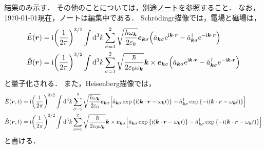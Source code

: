 \documentclass{report}
\begin{document}
  結果のみ示す．
  その他のことについては，別途\href{https://github.com/YutoMSD/physics_notes/blob/main/qft/main.pdf}{ノート}を参照すること．
  なお，\today 現在，ノートは編集中である．
  Schr\"odingr描像では，電場と磁場は，
  \begin{align}
    \hat{E}(\bm{r}) &= \mathrm{i}\qty(\frac{1}{2\pi})^{3/2}\int\dd[3]{k}\sum_{\sigma = 1}^{2}\sqrt{\frac{\hbar\omega_{\bm{k}}}{2\varepsilon_0}}\bm{e}_{\bm{k}\sigma}\qty(\hat{a}_{\bm{k}\sigma}\mathrm{e}^{\mathrm{i}\bm{k}\cdot\bm{r}} - \hat{a}_{\bm{k}\sigma}^{\dag}\mathrm{e}^{-\mathrm{i}\bm{k}\cdot\bm{r}}) \\ 
    \hat{B}(\bm{r}) &= \mathrm{i}\qty(\frac{1}{2\pi})^{3/2}\int\dd[3]{k}\sum_{\sigma = 1}^{2}\sqrt{\frac{\hbar}{2\varepsilon_0\omega_{\bm{k}}}}\bm{k}\times\bm{e}_{\bm{k}\sigma}\qty(\hat{a}_{\bm{k}\sigma}\mathrm{e}^{\mathrm{i}\bm{k}\cdot\bm{r}} - \hat{a}_{\bm{k}\sigma}^{\dag}\mathrm{e}^{-\mathrm{i}\bm{k}\cdot\bm{r}}) 
  \end{align}
  と量子化される．
  また，Heisenberg描像では，
  \begin{align}
    \hat{E}(\bm{r}, t) &= \mathrm{i}\qty(\frac{1}{2\pi})^{3/2}\int\dd[3]{k}\sum_{\sigma = 1}^{2}\sqrt{\frac{\hbar\omega_{\bm{k}}}{2\varepsilon_0}}\bm{e}_{\bm{k}\sigma}\qty[\hat{a}_{\bm{k}\sigma}\exp\qty{\mathrm{i}\qty(\bm{k}\cdot\bm{r} - \omega_{\bm{k}}t)} - \hat{a}_{\bm{k}\sigma}^{\dag}\exp\qty{-\mathrm{i}\qty(\bm{k}\cdot\bm{r} - \omega_{\bm{k}}t)}] \\ 
    \hat{B}(\bm{r}, t) &= \mathrm{i}\qty(\frac{1}{2\pi})^{3/2}\int\dd[3]{k}\sum_{\sigma = 1}^{2}\sqrt{\frac{\hbar}{2\varepsilon_0\omega_{\bm{k}}}}\bm{k}\times\bm{e}_{\bm{k}\sigma}\qty[\hat{a}_{\bm{k}\sigma}\exp\qty{\mathrm{i}\qty(\bm{k}\cdot\bm{r} - \omega_{\bm{k}}t)} - \hat{a}_{\bm{k}\sigma}^{\dag}\exp\qty{-\mathrm{i}\qty(\bm{k}\cdot\bm{r} - \omega_{\bm{k}}t)}]
  \end{align}
  と書ける．
\end{document}
